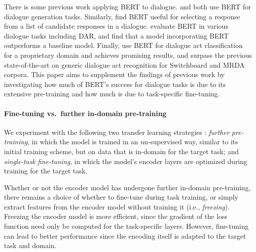 \documentclass[11pt,a4paper]{article}
\begin{document}
There is some previous work applying BERT to dialogue.
\citet{baoPLATOPretrainedDialogue2019} and \citet{chenSemanticallyConditionedDialog2019a} both use BERT for dialogue generation tasks.
Similarly, \citet{vigComparisonTransferLearningApproaches2019} find BERT useful for selecting a response from a list of candidate responses in a dialogue.
\citet{mehriPretrainingMethodsDialog2019} evaluate BERT in various dialogue tasks including DAR, and find that a model incorporating BERT outperforms a baseline model.
Finally, \citet{chakravarty2019dialog} use BERT for dialogue act classification for a proprietary domain and achieves promising results, and \citet{ribeiro2019deep} surpass the previous state-of-the-art on generic dialogue act recognition for Switchboard and MRDA corpora. 
This paper aims to supplement the findings of previous work by investigating how much of 
BERT's success for dialogue tasks is due to its extensive pre-training and how much is due to 
task-specific fine-tuning.




\paragraph{Fine-tuning vs.~further in-domain pre-training}
We experiment with the following two transfer learning strategies \citep{sunHowFineTuneBERT2019}:
\emph{further pre-training}, in which the model is trained in an un-supervised way, similar to its initial training scheme, but on data that is in-domain for the target task; and
\emph{single-task fine-tuning}, in which the model's encoder layers are optimized during training for the target task.

Whether or not the encoder model has undergone further in-domain pre-training, 
there remains a choice of whether to fine-tune during task training,
or simply extract features from the encoder model without training it (i.e., \emph{freezing}).
Freezing the encoder model is more efficient, 
since the gradient of the loss function need only be computed for the task-specific layers.
However, fine-tuning can lead to better performance since the encoding itself is adapted to the target task and domain.
\end{document}
